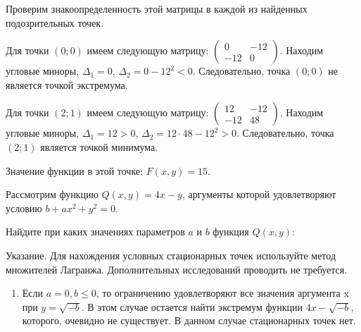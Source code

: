 \documentclass[addpoints, answers]{exam} %
\begin{document}
\begin{questions}
\begin{solution}
Проверим знакоопределенность этой матрицы в каждой из найденных подозрительных точек.


Для точки  $(0;0)$ имеем следующую матрицу:
$\begin{pmatrix}
0 & -12 \\
-12 & 0
\end{pmatrix}$.
Находим угловые миноры, $\Delta_1=0$, $\Delta_2=0-12^2<0$. Следовательно, точка $(0;0)$  не является точкой экстремума.


Для точки $(2;1)$  имеем следующую матрицу:
$\begin{pmatrix}
12 & -12 \\
-12 & 48
\end{pmatrix}.$
Находим угловые миноры, $\Delta_1=12>0$, $\Delta_2=12\cdot 48-12^2>0$.  Следовательно, точка $(2;1)$  является точкой минимума.

Значение функции в этой точке: $F(x,y)=15$.
\end{solution}



\question Рассмотрим функцию $Q(x,y)=4x-y$, аргументы которой удовлетворяют условию $b+ax^2+y^2=0$.

Найдите при каких значениях параметров $a$ и $b$  функция $Q(x,y)$:


Указание. Для нахождения условных стационарных точек используйте метод множителей Лагранжа. Дополнительных исследований проводить не требуется.

\begin{solution}
\begin{enumerate}
\item Если $a=0,b\le 0$, то ограничению удовлетворяют все значения аргумента x при $y=\sqrt{-b} $. В этом случае остается найти экстремум функции $4x-\sqrt{-b} $, которого, очевидно не существует. В данном случае стационарных точек нет.


\end{enumerate}
\end{solution}
\end{questions}
\end{document}
